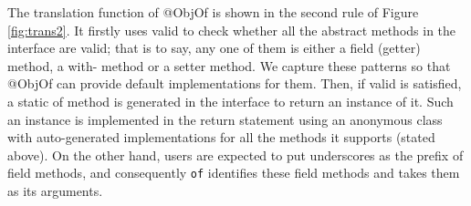 The translation function of \textsf{@ObjOf} is shown in the second rule of Figure \ref{fig:trans2}. It firstly uses \textsf{valid} to check whether all the abstract methods in the interface are valid; that is to say, any one of them is either a field (getter) method, a \textsf{with-} method or a setter method. We capture these patterns so that \textsf{@ObjOf} can provide default implementations for them. Then, if \textsf{valid} is satisfied, a static \textsf{of} method is generated in the interface to return an instance of it. Such an instance is implemented in the return statement using an anonymous class with auto-generated
implementations for all the methods it supports (stated above). On the other hand, users are expected to put underscores as the
prefix of field methods, and consequently \lstinline{of} identifies these field methods and takes them as its arguments.

